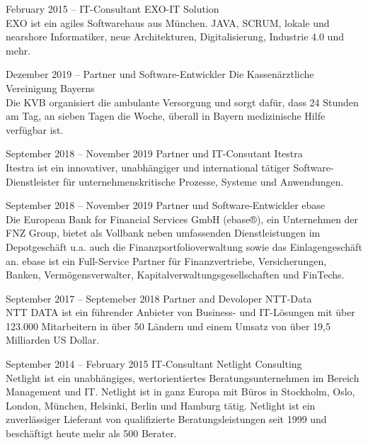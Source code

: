 \documentclass[fontsize=10pt]{tccv}
\begin{document}
\begin{eventlist}

\item{February 2015 -- }
     {IT-Consultant}
     {EXO-IT Solution}
\\
EXO ist ein agiles Softwarehaus aus München. JAVA, SCRUM, lokale und nearshore Informatiker, neue Architekturen, Digitalisierung, Industrie 4.0 und mehr.

\item{Dezember 2019 -- }
     {Partner und Software-Entwickler}
     {Die Kassenärztliche Vereinigung Bayerns}
\\
Die KVB organisiert die ambulante Versorgung und sorgt dafür, dass 24 Stunden
am Tag, an sieben Tagen die Woche, überall in Bayern medizinische Hilfe
verfügbar ist.

\item{September 2018 -- November 2019}
     {Partner und IT-Consutant}
     {Itestra}
\\
Itestra ist ein innovativer, unabhängiger und international tätiger
Software-Dienstleister für unternehmenskritische Prozesse, Systeme und
Anwendungen.

\item{September 2018 -- November 2019}
     {Partner und Software-Entwickler}
     {ebase}
\\
Die European Bank for Financial Services GmbH (ebase®), ein Unternehmen der FNZ
Group, bietet als Vollbank neben umfassenden Dienstleistungen im
Depotgeschäft u.a. auch die Finanzportfolioverwaltung sowie das
Einlagengeschäft an. ebase ist ein Full-Service Partner für
Finanzvertriebe, Versicherungen, Banken, Vermögensverwalter,
Kapitalverwaltungsgesellschaften und FinTechs.

\item{September 2017 -- Septemeber 2018}
     {Partner and Devoloper}
     {NTT-Data}
\\
NTT DATA ist ein führender Anbieter von Business- und IT-Lösungen mit über
123.000 Mitarbeitern in über 50 Ländern und einem Umsatz von über 19,5
Milliarden US Dollar.

\item{September 2014 -- February 2015}
     {IT-Consultant}
     {Netlight Consulting}
\\
Netlight ist ein unabhängiges, wertorientiertes Beratungsunternehmen im Bereich
Management und IT. Netlight ist in ganz Europa mit Büros in Stockholm,
Oslo, London, München, Helsinki, Berlin und Hamburg tätig. Netlight ist
ein zuverlässiger Lieferant von qualifizierte Beratungsleistungen seit
1999 und beschäftigt heute mehr als 500 Berater.


\end{eventlist}
\end{document}
